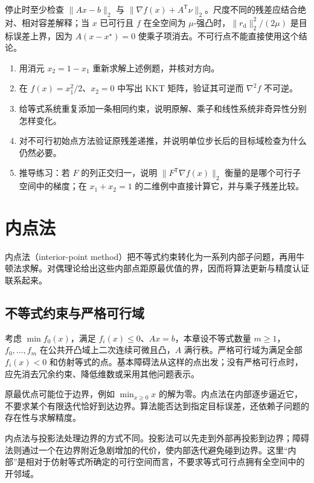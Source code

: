 \documentclass[UTF8,12pt,a4paper,fontset=fandol]{ctexbook}
\begin{document}
停止时至少检查 $\|Ax-b\|_2$ 与 $\|\nabla f(x)+A^{\mathsf T}\nu\|_2$。尺度不同的残差应结合绝对、相对容差解释；当 $x$ 已可行且 $f$ 在全空间为 $\mu$-强凸时，$\|r_{\mathrm d}\|_2^2/(2\mu)$ 是目标误差上界，因为 $A(x-x^\star)=0$ 使乘子项消去。不可行点不能直接使用这个结论。

\begin{enumerate}
 \item 用消元 $x_2=1-x_1$ 重新求解上述例题，并核对方向。
 \item 在 $f(x)=x_1^2/2$、$x_2=0$ 中写出 KKT 矩阵，验证其可逆而 $\nabla^2f$ 不可逆。
 \item 给等式系统重复添加一条相同约束，说明原解、乘子和线性系统非奇异性分别怎样变化。
 \item 对不可行初始点方法验证原残差递推，并说明单位步长后的目标域检查为什么仍然必要。
 \item 推导练习：若 $F$ 的列正交归一，说明 $\|F^{\mathsf T}\nabla f(x)\|_2$ 衡量的是哪个可行子空间中的梯度；在 $x_1+x_2=1$ 的二维例中直接计算它，并与乘子残差比较。
\end{enumerate}

\chapter{内点法}
\label{ch:co-interior}

内点法（interior-point method）把不等式约束转化为一系列内部子问题，再用牛顿法求解。对偶理论给出这些内部点距原最优值的界，因而将算法更新与精度认证联系起来。

\section{不等式约束与严格可行域}

考虑 $\min f_0(x)$，满足 $f_i(x)\leq0$、$Ax=b$，本章设不等式数量 $m\geq1$，$f_0,\ldots,f_m$ 在公共开凸域上二次连续可微且凸，$A$ 满行秩。严格可行域为满足全部 $f_i(x)<0$ 和仿射等式的点。基本障碍法从这样的点出发；没有严格可行点时，应先消去冗余约束、降低维数或采用其他问题表示。

原最优点可能位于边界，例如 $\min_{x\geq0}x$ 的解为零。内点法在内部逐步逼近它，不要求某个有限迭代恰好到达边界。算法能否达到指定目标误差，还依赖子问题的存在性与求解精度。

内点法与投影法处理边界的方式不同。投影法可以先走到外部再投影到边界；障碍法则通过一个在边界附近急剧增加的代价，使内部迭代避免碰到边界。这里“内部”是相对于仿射等式所确定的可行空间而言，不要求等式可行点拥有全空间中的开邻域。
\end{document}

